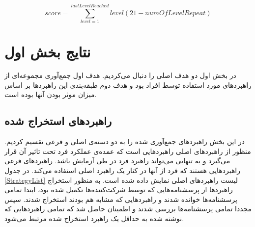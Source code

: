 \documentclass[twoside, a4paper,11pt]{book}
\numberwithin{equation}{chapter}
\numberwithin{table}{chapter}
\numberwithin{figure}{chapter}
\numberwithin{equation}{chapter}
\begin{document}
\begin{equation}
	score = \sum_{level=1}^{lastLevelReached} level(21-numOfLevelRepeat)
\end{equation}


\section{نتایج بخش اول}
در بخش اول دو هدف اصلی را دنبال می‌کردیم. هدف اول جمع‌آوری مجموعه‌ای از راهبرد‌های مورد استفاده توسط افراد بود و هدف دوم طبقه‌بندی این راهبرد‌ها بر اساس میزان موثر بودن آنها بوده است.
\subsection{راهبرد‌های استخراج شده}
در این بخش راهبرد‌های جمع‌آوری شده را  به دو دسته‌ی اصلی و فرعی تقسیم  کردیم. منظور از راهبردهای اصلی راهبرد‌هایی است که عمده‌ی عملکرد فرد تحت تاثیر آن قرار می‌گیرد و به تنهایی می‌تواند راهبرد فرد در طی آزمایش باشد. راهبردهای فرعی راهبردهایی هستند که فرد از آنها در کنار یک راهبرد اصلی استفاده می‌کند. در جدول \ref{StrategyList} لیست راهبرد‌های اصلی نمایش داده شده است. به منظور استخراج راهبرد‌ها از پرسشنامه‌هایی که توسط شرکت‌کننده‌ها تکمیل شده بود، ابتدا تمامی پرسشنامه‌ها خوانده شدند و راهبردهایی که مشابه هم بودند استخراج شدند. سپس مجددا تمامی پرسشنامه‌ها بررسی شدند و اطمینان حاصل شد که تمامی راهبرد‌هایی که نوشته شده به حداقل یک راهبرد استخراج شده مرتبط می‌شود. 
\end{document}
